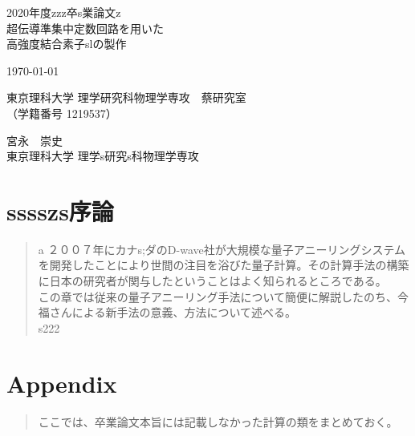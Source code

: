 \documentclass[platex,openany,oneside,a4j,11pt]{jsbook}
\begin{document}
\begin{titlepage}
    \begin{center}
        {\Large 2020年度zzz卒s業論文z}\\
        \vspace{180truept}
        {\Huge 超伝導準集中定数回路を用いた\\
        \vspace{10truept}
        高強度結合素子slの製作}\\ 
        \vspace{70truept}

        {\Large \today}\\

        \vspace{70truept}

        {\Large 東京理科大学 理学研究科物理学専攻　蔡研究室\\
        （学籍番号 1219537）}\\

        \vspace{20truept}

        {\huge 宮永　崇史}\\

        \vspace{160truept}
        {\Large 東京理科大学 理学s研究s科物理学専攻}\\
    \end{center}
\end{titlepage}
%

\chapter{sssszs序論}
    \begin{abstract}
        \cite{nakamura1999coherent}%
        a
        ２００７年にカナs;ダのD-wave社が大規模な量子アニーリングシステムを開発したことにより世間の注目を浴びた量子計算。その計算手法の構築に日本の研究者が関与したということはよく知られるところである。\\
        この章では従来の量子アニーリング手法について簡便に解説したのち、今福さんによる新手法の意義、方法について述べる。\\
        s222
    \end{abstract}
    

\chapter{Appendix}
\begin{abstract}
    ここでは、卒業論文本旨には記載しなかった計算の類をまとめておく。

\end{abstract}
    
\end{document}
